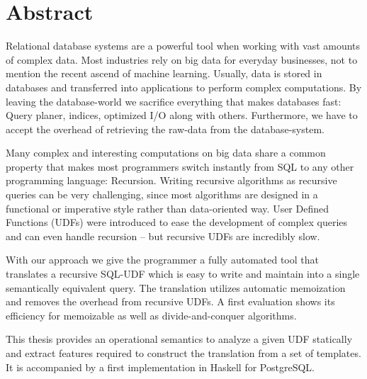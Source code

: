 \section*{Abstract}
Relational database systems are a powerful tool when working with vast amounts of complex data. Most industries rely on big data for everyday businesses, not to mention the recent ascend of machine learning. Usually, data is stored in databases and transferred into applications to perform complex computations. By leaving the database-world we sacrifice everything that makes databases fast: Query planer, indices, optimized I/O along with others. Furthermore, we have to accept the overhead of retrieving the raw-data from the database-system.

Many complex and interesting computations on big data share a common property that makes most programmers switch instantly from SQL to any other programming language: Recursion. Writing recursive algorithms as recursive queries can be very challenging, since most algorithms are designed in a functional or imperative style rather than data-oriented way. User Defined Functions (UDFs) were introduced to ease the development of complex queries and can even handle recursion -- but recursive UDFs are incredibly slow.

With our approach we give the programmer a fully automated tool that translates a recursive SQL-UDF which is easy to write and maintain into a single semantically equivalent query. The translation utilizes automatic memoization and removes the overhead from recursive UDFs. A first evaluation shows its efficiency for memoizable as well as divide-and-conquer algorithms. 

This thesis provides an operational semantics to analyze a given UDF statically and extract features required to construct the translation from a set of templates. It is accompanied by a first implementation in Haskell for PostgreSQL.